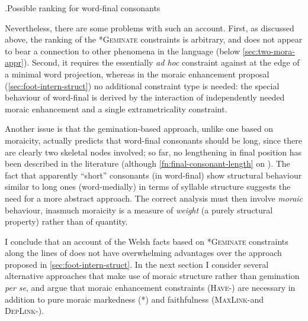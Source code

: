 \ex.\label{ex:geminate-analysis-final-tableau}Possible ranking for word-final consonants\\

Nevertheless, there are some problems with such an account. First, as discussed above, the ranking of the \textsc{*Geminate} constraints is arbitrary, and does not appear to bear a connection to other phenomena in the language (\cf below \cref{sec:two-mora-appr}). Second, it requires the essentially \emph{ad hoc} constraint against \ipa{[s~ʃ~ɬ]} at the edge of a minimal word projection, whereas in the moraic enhancement proposal (\cref{sec:foot-intern-struct}) no additional constraint type is needed: the special behaviour of word\hyp final \ipa{[s~ʃ~ɬ]} is derived by the interaction of independently needed moraic enhancement and a single extrametricality constraint.

Another issue is that the  gemination\hyp based approach, unlike one based on moraicity, actually predicts that word\hyp final consonants should be long, since there are clearly two skeletal nodes involved; so far, no lengthening in final position has been described in the literature (although \cf \cref{fn:final-consonant-length} on ). The fact that apparently \enquote{short} consonants (in word\hyp final) show structural behaviour similar to long ones (word\hyp medially) in terms of syllable structure suggests the need for a more abstract approach. The correct analysis must then involve \emph{moraic} behaviour, inasmuch moraicity is a measure of \emph{weight} (a purely structural property) rather than of quantity.

I conclude that an account of the Welsh facts based on \textsc{*Geminate} constraints along the lines of \citet{bye08} does not have overwhelming advantages over the approach proposed in \cref{sec:foot-intern-struct}. In the next section I consider several alternative approaches that make use of moraic structure rather than gemination \emph{per se}, and argue that moraic enhancement constraints (\textsc{Have-\mo}) are necessary in addition to pure moraic markedness (*\mo) and faithfulness (\textsc{MaxLink}-\mo and \textsc{DepLink}-\mo).

